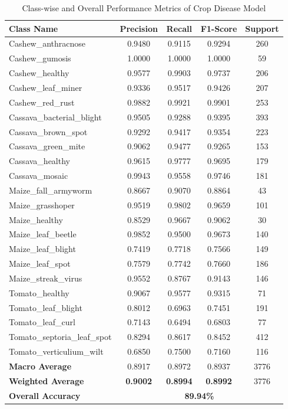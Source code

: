 \begin{table}[htbp]
\centering
\caption{Class-wise and Overall Performance Metrics of Crop Disease Model}
\label{tab:crop_disease_metrics}
\begin{tabular}{|l|c|c|c|c|}
\hline
\textbf{Class Name} & \textbf{Precision} & \textbf{Recall} & \textbf{F1-Score} & \textbf{Support} \\ \hline
Cashew\_anthracnose & 0.9480 & 0.9115 & 0.9294 & 260 \\
Cashew\_gumosis & 1.0000 & 1.0000 & 1.0000 & 59 \\
Cashew\_healthy & 0.9577 & 0.9903 & 0.9737 & 206 \\
Cashew\_leaf\_miner & 0.9336 & 0.9517 & 0.9426 & 207 \\
Cashew\_red\_rust & 0.9882 & 0.9921 & 0.9901 & 253 \\
Cassava\_bacterial\_blight & 0.9505 & 0.9288 & 0.9395 & 393 \\
Cassava\_brown\_spot & 0.9292 & 0.9417 & 0.9354 & 223 \\
Cassava\_green\_mite & 0.9062 & 0.9477 & 0.9265 & 153 \\
Cassava\_healthy & 0.9615 & 0.9777 & 0.9695 & 179 \\
Cassava\_mosaic & 0.9943 & 0.9558 & 0.9746 & 181 \\
Maize\_fall\_armyworm & 0.8667 & 0.9070 & 0.8864 & 43 \\
Maize\_grasshoper & 0.9519 & 0.9802 & 0.9659 & 101 \\
Maize\_healthy & 0.8529 & 0.9667 & 0.9062 & 30 \\
Maize\_leaf\_beetle & 0.9852 & 0.9500 & 0.9673 & 140 \\
Maize\_leaf\_blight & 0.7419 & 0.7718 & 0.7566 & 149 \\
Maize\_leaf\_spot & 0.7579 & 0.7742 & 0.7660 & 186 \\
Maize\_streak\_virus & 0.9552 & 0.8767 & 0.9143 & 146 \\
Tomato\_healthy & 0.9067 & 0.9577 & 0.9315 & 71 \\
Tomato\_leaf\_blight & 0.8012 & 0.6963 & 0.7451 & 191 \\
Tomato\_leaf\_curl & 0.7143 & 0.6494 & 0.6803 & 77 \\
Tomato\_septoria\_leaf\_spot & 0.8294 & 0.8617 & 0.8452 & 412 \\
Tomato\_verticulium\_wilt & 0.6850 & 0.7500 & 0.7160 & 116 \\
\hline
\textbf{Macro Average} & 0.8917 & 0.8972 & 0.8937 & 3776 \\
\textbf{Weighted Average} & \textbf{0.9002} & \textbf{0.8994} & \textbf{0.8992} & 3776 \\
\textbf{Overall Accuracy} & \multicolumn{4}{c|}{\textbf{89.94\%}} \\
\hline
\end{tabular}
\end{table}
